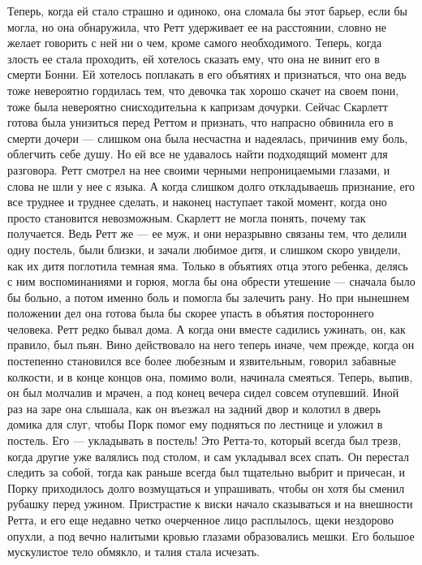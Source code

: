 Теперь, когда ей стало страшно и одиноко, она сломала бы этот барьер, если бы могла, но она обнаружила, что Ретт удерживает ее на расстоянии, словно не желает говорить с ней ни о чем, кроме самого необходимого. Теперь, когда злость ее стала проходить, ей хотелось сказать ему, что она не винит его в смерти Бонни. Ей хотелось поплакать в его объятиях и признаться, что она ведь тоже невероятно гордилась тем, что девочка так хорошо скачет на своем пони, тоже была невероятно снисходительна к капризам дочурки. Сейчас Скарлетт готова была унизиться перед Реттом и признать, что напрасно обвинила его в смерти дочери — слишком она была несчастна и надеялась, причинив ему боль, облегчить себе душу. Но ей все не удавалось найти подходящий момент для разговора. Ретт смотрел на нее своими черными непроницаемыми глазами, и слова не шли у нее с языка. А когда слишком долго откладываешь признание, его все труднее и труднее сделать, и наконец наступает такой момент, когда оно просто становится невозможным.
Скарлетт не могла понять, почему так получается. Ведь Ретт же — ее муж, и они неразрывно связаны тем, что делили одну постель, были близки, и зачали любимое дитя, и слишком скоро увидели, как их дитя поглотила темная яма. Только в объятиях отца этого ребенка, делясь с ним воспоминаниями и горюя, могла бы она обрести утешение — сначала было бы больно, а потом именно боль и помогла бы залечить рану. Но при нынешнем положении дел она готова была бы скорее упасть в объятия постороннего человека.
Ретт редко бывал дома. А когда они вместе садились ужинать, он, как правило, был пьян. Вино действовало на него теперь иначе, чем прежде, когда он постепенно становился все более любезным и язвительным, говорил забавные колкости, и в конце концов она, помимо воли, начинала смеяться. Теперь, выпив, он был молчалив и мрачен, а под конец вечера сидел совсем отупевший. Иной раз на заре она слышала, как он въезжал на задний двор и колотил в дверь домика для слуг, чтобы Порк помог ему подняться по лестнице и уложил в постель. Его — укладывать в постель! Это Ретта-то, который всегда был трезв, когда другие уже валялись под столом, и сам укладывал всех спать.
Он перестал следить за собой, тогда как раньше всегда был тщательно выбрит и причесан, и Порку приходилось долго возмущаться и упрашивать, чтобы он хотя бы сменил рубашку перед ужином. Пристрастие к виски начало сказываться и на внешности Ретта, и его еще недавно четко очерченное лицо расплылось, щеки нездорово опухли, а под вечно налитыми кровью глазами образовались мешки. Его большое мускулистое тело обмякло, и талия стала исчезать.
